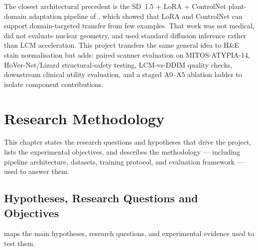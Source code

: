 \documentclass[a4paper,twoside,12pt]{report}
\begin{document}
The closest architectural precedent is the SD~1.5 + LoRA + ControlNet plant-domain adaptation pipeline of \citet{hartley2024plant}, which showed that LoRA and ControlNet can support domain-targeted transfer from few examples. That work was not medical, did not evaluate nuclear geometry, and used standard diffusion inference rather than LCM acceleration. This project transfers the same general idea to H\&E stain normalisation but adds: paired scanner evaluation on MITOS-ATYPIA-14, HoVer-Net/Lizard structural-safety testing, LCM-vs-DDIM quality checks, downstream clinical utility evaluation, and a staged A0--A5 ablation ladder to isolate component contributions.

\chapter{Research Methodology}
\label{chap:methodology}

This chapter states the research questions and hypotheses that drive the project, lists the experimental objectives, and describes the methodology --- including pipeline architecture, datasets, training protocol, and evaluation framework --- used to answer them.


\section{Hypotheses, Research Questions and Objectives}

 maps the main hypotheses, research questions, and experimental evidence used to test them.
\end{document}
